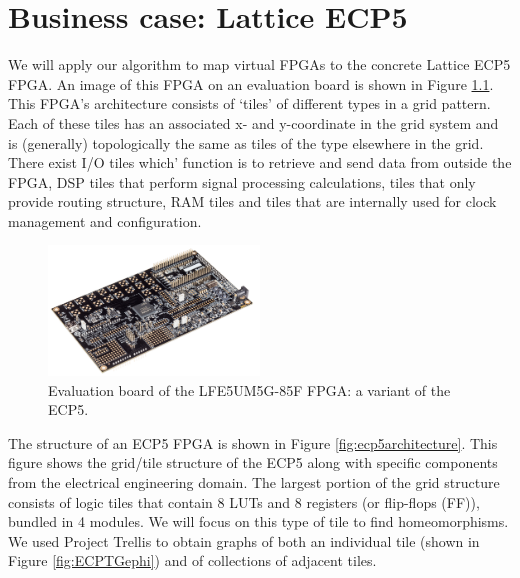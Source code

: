 \chapter{Business case: Lattice ECP5}
We will apply our algorithm to map virtual FPGAs to the concrete Lattice ECP5 FPGA. An image of this FPGA on an evaluation board is shown in Figure \ref{fig:evaluationboard}. This FPGA's architecture consists of `tiles' of different types in a grid pattern. Each of these tiles has an associated x- and y-coordinate in the grid system and is (generally) topologically the same as tiles of the type elsewhere in the grid. There exist I/O tiles which' function is to retrieve and send data from outside the FPGA, DSP tiles that perform signal processing calculations, tiles that only provide routing structure, RAM tiles and tiles that are internally used for clock management and configuration.

\begin{figure}
\centering
\includegraphics[width=0.5\textwidth]{images/ECP5.png}
\caption[Evaluation board of the LFE5UM5G-85F FPGA: a variant of the ECP5.]{Evaluation board of the LFE5UM5G-85F FPGA: a variant of the ECP5.\footnotemark}
\label{fig:evaluationboard}
\end{figure}

The structure of an ECP5 FPGA is shown in Figure \ref{fig:ecp5architecture}. This figure shows the grid/tile structure of the ECP5 along with specific components from the electrical engineering domain. The largest portion of the grid structure consists of logic tiles that contain 8 LUTs and 8 registers (or flip-flops (FF)), bundled in 4 modules. We will focus on this type of tile to find homeomorphisms. We used Project Trellis \cite{trellis} to obtain graphs of both an individual tile (shown in Figure \ref{fig:ECPTGephi}) and of collections of adjacent tiles.

